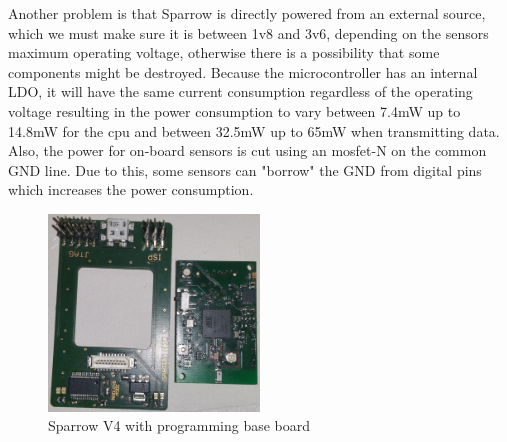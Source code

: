 Another problem is that Sparrow is directly powered from an external source, which we must make
sure it is between 1v8 and 3v6, depending on the sensors maximum operating voltage, otherwise there
is a possibility that some components might be destroyed. Because the
microcontroller has an internal LDO, it will have the same current consumption regardless of the
operating voltage resulting in the power consumption to vary between 7.4mW up to 14.8mW for the cpu
and between 32.5mW up to 65mW when transmitting data. Also, the power for on-board sensors is cut
using an mosfet-N on the common GND line. Due to this, some sensors can "borrow" the GND from
digital pins which increases the power consumption.
\begin{figure}[ht] \centering
\includegraphics[width=0.5\textwidth]{img/sparrowv4.jpg}
\caption{Sparrow V4 with programming base board}
\end{figure}



